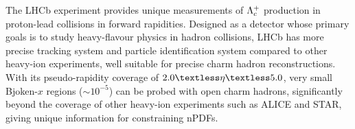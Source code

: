 The LHCb experiment provides unique measurements of ${{\Lambda}^+_{c}}$ production in proton-lead collisions in forward rapidities.
Designed as a detector whose primary goals is to study heavy-flavour physics in hadron collisions,
LHCb has more precise tracking system and particle identification system compared to other heavy-ion experiments,
well suitable for precise charm hadron reconstructions.
With its pseudo-rapidity coverage of $2.0\textless \eta \textless 5.0$,
very small Bjoken-$x$ regions ($\sim10^{-5}$) can be probed with open charm hadrons,
significantly beyond the coverage of other heavy-ion experiments such as ALICE and STAR,
giving unique information for constraining nPDFs.

